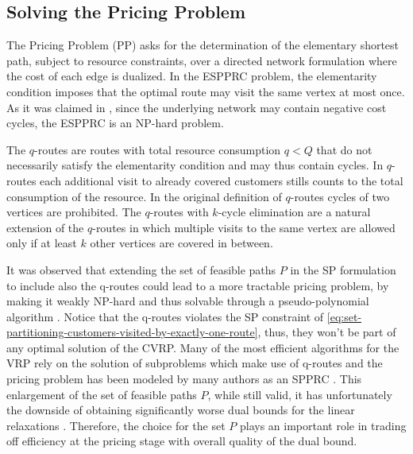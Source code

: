 \subsection{Solving the Pricing Problem}
\label{sec:intro-solving-the-pricing-problem}

The Pricing Problem (PP) asks for the determination of the elementary shortest path,
subject to resource constraints,
over a directed network formulation where the cost of each edge
is dualized.
In the ESPPRC problem, the elementarity condition imposes
that the optimal route may visit the same vertex at most once.
As it was claimed in \textcite{dror1994},
since the underlying network may contain negative cost cycles,
the ESPPRC is an NP-hard problem.

\medskip

The $q$-routes \parencite{christofides1981}
are routes with total resource consumption $q < Q$
that do not necessarily satisfy the elementarity condition and may thus contain cycles.
In $q$-routes each additional visit to already covered customers
stills counts to the total consumption of the resource.
In the original definition of $q$-routes cycles of two vertices are prohibited.
The $q$-routes with $k$-cycle elimination
are a natural extension of the $q$-routes
in which multiple visits to the same vertex are allowed only
if at least $k$ other vertices are covered in between.


It was observed that extending the set of feasible paths $P$ in
the SP formulation to include also the q-routes could lead to a
more tractable pricing problem, by making it weakly NP-hard
and thus solvable through a pseudo-polynomial algorithm \parencite{desrochers1988, irnich2005}.
Notice that the q-routes violates the SP constraint of \cref{eq:set-partitioning-customers-visited-by-exactly-one-route},
thus, they won't be part of any optimal solution of the CVRP.
Many of the most efficient algorithms for the VRP
rely on the solution of subproblems which
make use of q-routes and the pricing
problem has been modeled by many authors as an SPPRC \parencite{desrochers1992, feillet2004, fukasawa2006,contardo2011}.
This enlargement of the set of feasible paths $P$,
while still valid,
it has unfortunately the downside
of obtaining significantly worse dual bounds for the linear relaxations \parencite{feillet2004}.
Therefore, the choice for the set $P$ plays an important
role in trading off efficiency at the pricing stage with
overall quality of the dual bound.


